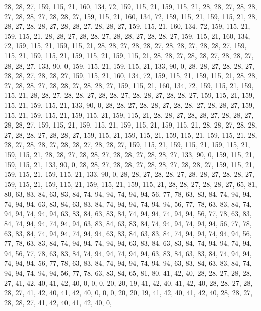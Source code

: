 28, 28, 27, 159, 115, 21, 160, 134, 72, 159, 115, 21, 159, 115, 21, 28, 28, 27, 28, 28, 27, 28, 28, 27, 28, 28, 27, 159, 115, 21, 160, 134, 72, 159, 115, 21, 159, 115, 21, 28, 28, 27, 28, 28, 27, 28, 28, 27, 28, 28, 27, 159, 115, 21, 160, 134, 72, 159, 115, 21, 159, 115, 21, 28,
28, 27, 28, 28, 27, 28, 28, 27, 28, 28, 27, 159, 115, 21, 160, 134, 72, 159, 115, 21, 159, 115, 21, 28, 28, 27, 28, 28, 27, 28, 28, 27, 28, 28, 27, 159, 115, 21, 159, 115, 21, 159, 115, 21, 159, 115, 21, 28, 28, 27, 28, 28, 27, 28, 28, 27, 28, 28, 27, 133, 90, 0, 159, 115,
21, 159, 115, 21, 133, 90, 0, 28, 28, 27, 28, 28, 27, 28, 28, 27, 28, 28, 27, 159, 115, 21, 160, 134, 72, 159, 115, 21, 159, 115, 21, 28, 28, 27, 28, 28, 27, 28, 28, 27, 28, 28, 27, 159, 115, 21, 160, 134, 72, 159, 115, 21, 159, 115, 21, 28, 28, 27, 28, 28, 27, 28, 28, 27,
28, 28, 27, 28, 28, 27, 159, 115, 21, 159, 115, 21, 159, 115, 21, 133, 90, 0, 28, 28, 27, 28, 28, 27, 28, 28, 27, 28, 28, 27, 159, 115, 21, 159, 115, 21, 159, 115, 21, 159, 115, 21, 28, 28, 27, 28, 28, 27, 28, 28, 27, 28, 28, 27, 159, 115, 21, 159, 115, 21, 159, 115, 21, 159,
115, 21, 28, 28, 27, 28, 28, 27, 28, 28, 27, 28, 28, 27, 159, 115, 21, 159, 115, 21, 159, 115, 21, 159, 115, 21, 28, 28, 27, 28, 28, 27, 28, 28, 27, 28, 28, 27, 159, 115, 21, 159, 115, 21, 159, 115, 21, 159, 115, 21, 28, 28, 27, 28, 28, 27, 28, 28, 27, 28, 28, 27, 133, 90,
0, 159, 115, 21, 159, 115, 21, 133, 90, 0, 28, 28, 27, 28, 28, 27, 28, 28, 27, 28, 28, 27, 159, 115, 21, 159, 115, 21, 159, 115, 21, 133, 90, 0, 28, 28, 27, 28, 28, 27, 28, 28, 27, 28, 28, 27, 159, 115, 21, 159, 115, 21, 159, 115, 21, 159, 115, 21, 28, 28, 27, 28, 28, 27,
65, 81, 80, 63, 83, 84, 63, 83, 84, 74, 94, 94, 74, 94, 94, 56, 77, 78, 63, 83, 84, 74, 94, 94, 74, 94, 94, 63, 83, 84, 63, 83, 84, 74, 94, 94, 74, 94, 94, 56, 77, 78, 63, 83, 84, 74, 94, 94, 74, 94, 94, 63, 83, 84, 63, 83, 84, 74, 94, 94, 74, 94, 94, 56,
77, 78, 63, 83, 84, 74, 94, 94, 74, 94, 94, 63, 83, 84, 63, 83, 84, 74, 94, 94, 74, 94, 94, 56, 77, 78, 63, 83, 84, 74, 94, 94, 74, 94, 94, 63, 83, 84, 63, 83, 84, 74, 94, 94, 74, 94, 94, 56, 77, 78, 63, 83, 84, 74, 94, 94, 74, 94, 94, 63, 83, 84, 63, 83,
84, 74, 94, 94, 74, 94, 94, 56, 77, 78, 63, 83, 84, 74, 94, 94, 74, 94, 94, 63, 83, 84, 63, 83, 84, 74, 94, 94, 74, 94, 94, 56, 77, 78, 63, 83, 84, 74, 94, 94, 74, 94, 94, 63, 83, 84, 63, 83, 84, 74, 94, 94, 74, 94, 94, 56, 77, 78, 63, 83, 84, 65, 81, 80,
41, 42, 40, 28, 28, 27, 28, 28, 27, 41, 42, 40, 41, 42, 40, 0, 0, 0, 20, 20, 19, 41, 42, 40, 41, 42, 40, 28, 28, 27, 28, 28, 27, 41, 42, 40, 41, 42, 40, 0, 0, 0, 20, 20, 19, 41, 42, 40, 41, 42, 40, 28, 28, 27, 28, 28, 27, 41, 42, 40, 41, 42, 40, 0,
